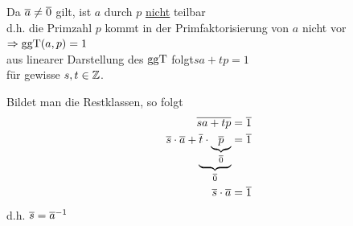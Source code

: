 \Beweis Da $\overline{a}\ne\overline{0}$ gilt, ist $a$ durch $p$ \ul{nicht} teilbar\\
d.h. die Primzahl $p$ kommt in der Primfaktorisierung von $a$ nicht vor $\Rightarrow\mathbin\text{ggT}(a,p)=1$\\
aus linearer Darstellung des $\mathbin\text{ggT}$ folgt\qquad $sa+tp=1$\\
für gewisse $s,t\in\mathbb{Z}$.

Bildet man die Restklassen, so folgt
\begin{align*}
\overline{sa+tp}&=\overline{1}\\
\overline{s}\cdot\overline{a}+\underbrace{\overline{t}\cdot\underbrace{\overline{p}}_{\overline{0}}}_{\overline{0}}&=\overline{1}\\
\overline{s}\cdot\overline{a}&=\overline{1}\\
\end{align*}
d.h. $\overline{s}={\overline{a}}^{-1}$


